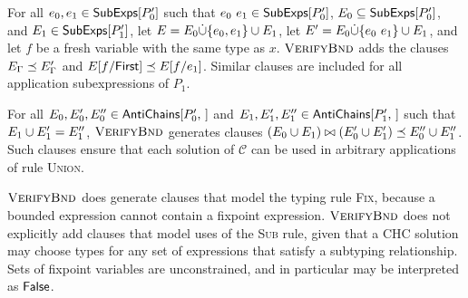 For all $e_0, e_1 \in \subexps{P_0'}$ such that $e_0\ e_1 \in
\subexps{P_0'}$, %
$E_0 \subseteq \subexps{P_0'}$, and %
$E_1 \in \subexps{P_1'}$, let $E = E_0 \disjunion \elts{ e_0, e_1 }
\union E_1$, %
let $E' = E_0 \disjunion \elts{ e_0\ e_1 } \union E_1$, and %
let $f$ be a fresh variable with the same type as $x$.
%
$\verifybnd$ adds the clauses 
$E_{\Gamma} \subtype E'_{\Gamma}$ and %
$\replace{ E }{ \firstarg{e_0} }{ f } \subtype \replace{ E }{ e_1 }{ f
}$.
%
%
Similar clauses are included for all application subexpressions of
$P_1$.

For all $E_0, E_0', E_0'' \in \antichains{ P_0' }$ and %
$E_1, E_1', E_1'' \in \antichains{ P_1' }$ such that $E_1 \union E_1'
= E_1''$, $\verifybnd$ generates clauses $(E_0 \union E_1) \joinctr
(E_0' \union E_1') \subtype E_0'' \union E_1''$.
%
Such clauses ensure that each solution of $\mathcal{C}$ can be used in
arbitrary applications of rule \textsc{Union}.


$\verifybnd$ does generate clauses that model the typing rule
\textsc{Fix}, because a bounded expression cannot contain a fixpoint
expression.
%
$\verifybnd$ does not explicitly add clauses that model uses of the
\textsc{Sub} rule, given that a CHC solution may choose types for any
set of expressions that satisfy a subtyping relationship.
%
Sets of fixpoint variables are unconstrained, and in particular may be
interpreted as $\false$.

